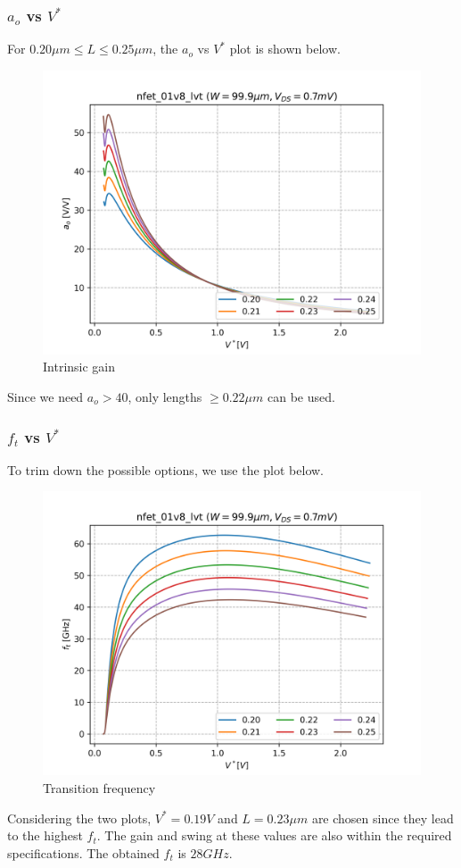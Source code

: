 \documentclass[conference]{IEEEtran}
\begin{document}
\subsubsection{$a_o$ vs $V^*$} 
For $0.20\mu m \leq L \leq 0.25\mu m$, the $a_o$ vs $V^*$ plot is shown below. 
\begin{figure}[H]
	\centering 
	\includegraphics[width=\columnwidth]{vstar-ao-maxft.png}
	\caption{Intrinsic gain}
	\label{vstar-ao-2}	
\end{figure}
Since we need $a_o > 40$, only lengths $\geq 0.22\mu m$ can be used. 

\vspace{8pt}
\subsubsection{$f_t$ vs $V^*$} 
To trim down the possible options, we use the plot below. 
\begin{figure}[H]
	\centering 
	\includegraphics[width=\columnwidth]{vstar-ft-maxft.png}
	\caption{Transition frequency}
	\label{vstar-ft-2}	
\end{figure}
Considering the two plots, $V^*=0.19V$ and $L=0.23\mu m$ are chosen since they lead to the highest $f_t$. The gain and swing at these values are also within the required specifications. The obtained $f_t$ is $28GHz$.
\end{document}
